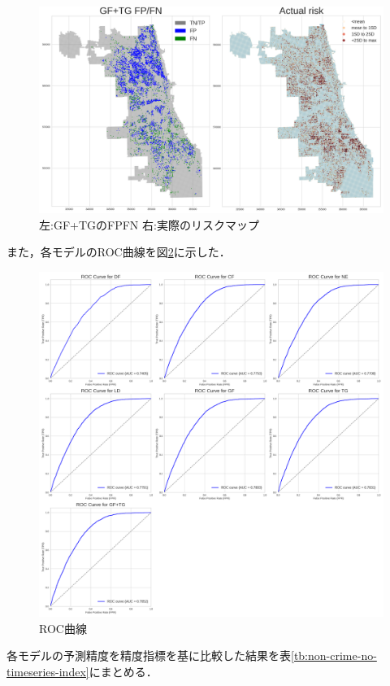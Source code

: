 \begin{figure}
  \centering %
  \includegraphics[scale=0.25]{./non-crime-no-timeseries-fig/GF+TG_fnp.png}
  \caption{左:GF+TGのFPFN 右:実際のリスクマップ}
  \label{fig:non-crime-no-timeseries-gf-tg-fnp}
\end{figure}
また，各モデルのROC曲線を図\ref{fig:non-crime-no-timeseries-roc}に示した．

\begin{figure}
  \centering %
  \includegraphics[scale=0.25]{./non-crime-no-timeseries-fig/roc_auc.png}
  \caption{ROC曲線}
  \label{fig:non-crime-no-timeseries-roc}
\end{figure}
各モデルの予測精度を精度指標を基に比較した結果を表\ref{tb:non-crime-no-timeseries-index}にまとめる．

